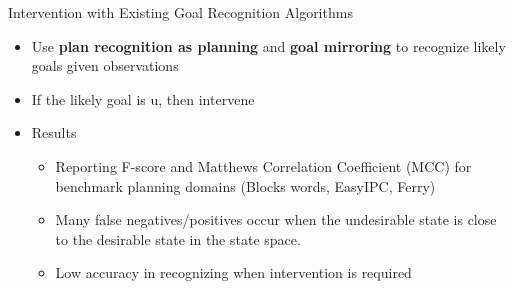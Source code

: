 \begin{frame}{Intervention with Existing Goal Recognition Algorithms}
\begin{itemize}
\item Use \textbf{plan recognition as planning} and \textbf{goal mirroring} to recognize likely goals given observations
\item If the likely goal is $\mathrm{u}$, then intervene
\item Results
\begin{itemize}
\item Reporting F-score and Matthews Correlation Coefficient (MCC) for benchmark planning domains (Blocks words, EasyIPC, Ferry)
\item Many false negatives/positives occur when the undesirable state is close to the desirable state in the state space.
\item Low accuracy in recognizing when intervention is required
\end{itemize}
\end{itemize}

\end{frame}